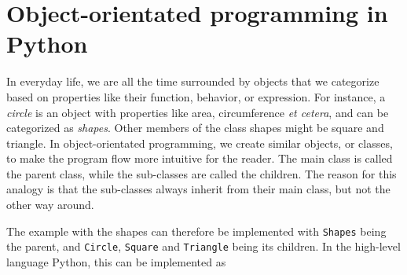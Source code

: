 \section{Object-orientated programming in Python}
In everyday life, we are all the time surrounded by objects that we categorize based on properties like their function, behavior, or expression. For instance, a \textit{circle} is an object with properties like area, circumference \textit{et cetera}, and can be categorized as \textit{shapes}. Other members of the class shapes might be square and triangle. In object-orientated programming, we create similar objects, or classes, to make the program flow more intuitive for the reader. The main class is called the parent class, while the sub-classes are called the children. The reason for this analogy is that the sub-classes always inherit from their main class, but not the other way around. 

The example with the shapes can therefore be implemented with \texttt{Shapes} being the parent, and \texttt{Circle}, \texttt{Square} and \texttt{Triangle} being its children. In the high-level language Python, this can be implemented as 

